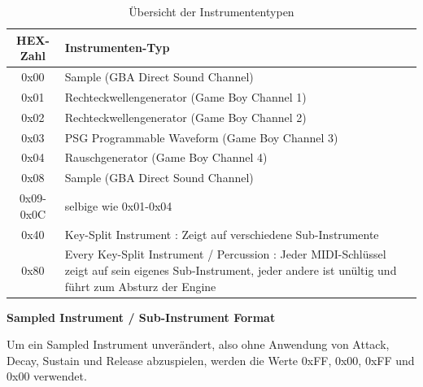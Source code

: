 \documentclass[11pt,a4paper]{scrartcl}
\newcommand{\paratitle}[1] {
    \vspace{5mm}
    \large \textbf{#1} \normalsize
    \vspace{2mm}\newline
}
\begin{document}
\begin{table}[h]
    \centering
    \begin{tabular}{ c | p{15cm} }
        \textbf{HEX-Zahl} & \textbf{Instrumenten-Typ} \\
        \hline
        0x00 & Sample (GBA Direct Sound Channel) \\
        \hline
        0x01 & Rechteckwellengenerator (Game Boy Channel 1) \\
        \hline
        0x02 & Rechteckwellengenerator (Game Boy Channel 2) \\
        \hline
        0x03 & PSG Programmable Waveform (Game Boy Channel 3) \\
        \hline
        0x04 & Rauschgenerator (Game Boy Channel 4) \\
        \hline
        0x08 & Sample (GBA Direct Sound Channel) \\
        \hline
        0x09-0x0C & selbige wie 0x01-0x04\\
        \hline
        0x40 & Key-Split Instrument : Zeigt auf verschiedene Sub-Instrumente \\
        \hline
        0x80 & Every Key-Split Instrument / Percussion : Jeder MIDI-Schl\"ussel zeigt auf sein eigenes Sub-Instrument, jeder andere ist un\"ultig und f\"uhrt zum Absturz der Engine  \\
    \end{tabular}
    \caption{\"Ubersicht der Instrumententypen}
    \label{table:InstrumentenTyp}
\end{table}

\paratitle{Sampled Instrument / Sub-Instrument Format}
Um ein Sampled Instrument unver\"andert, also ohne Anwendung von Attack, Decay, Sustain und Release abzuspielen, werden die Werte 0xFF, 0x00, 0xFF und 0x00 verwendet.
\end{document}
